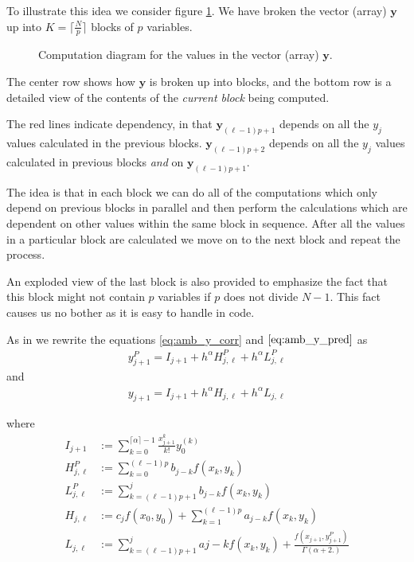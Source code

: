 To illustrate this idea we consider figure \ref{fig:comp_diag}. We have broken the vector (array) $ \mathbf{y} $ up into $ K = \lceil \frac{N}{p} \rceil $ blocks of $ p $ variables.


\begin{figure}[h]

\caption{Computation diagram for the values in the vector (array) $ \mathbf{y} $.}
\label{fig:comp_diag}
\end{figure} 

The center row shows how $ \mathbf{y} $ is broken up into blocks, and the bottom row is a detailed view
of the contents of the \emph{current block} being computed.

The red lines indicate dependency, in that $ \mathbf{y}_{(\ell - 1)p + 1} $ depends on all the $ y_j $ values calculated in the previous blocks. $ \mathbf{y}_{(\ell - 1)p + 2} $ depends on all the $ y_j $ values calculated in previous blocks \emph{and} on $ \mathbf{y}_{(\ell - 1)p + 1 } $. 

The idea is that in each block we can do all of the computations which only depend on previous blocks in parallel and then perform the calculations which are dependent on other values within the same block in sequence. After all the values in a particular block are calculated we move on to the next block and repeat the process.

An exploded view of the last block is also provided to emphasize the fact that this block might not contain $ p $ variables if $ p $ does not divide $ N - 1 $. This fact causes us no bother as it is easy to handle in code.

As in \cite{Diethelm2011} we rewrite the equations \eqref{eq:amb_y_corr} and $ \eqref{eq:amb_y_pred} $ as
\begin{align}
y_{j+1}^P = I_{j+1} + h^\alpha H_{j,\ell}^P + h^\alpha L_{j,\ell}^P
\end{align}
and
\begin{align}
y_{j+1} = I_{j+1} + h^{\alpha} H_{j,\ell} + h^\alpha L_{j,\ell}
\end{align}

where
\begin{align}
I_{j+1} & := \sum_{k=0}^{\lceil \alpha \rceil -1} \frac{x_{j+1}^k}{k!} y_0^{(k)} \\
H^P_{j,\ell} & := \sum_{k=0}^{(\ell-1)p} b_{j-k} f(x_k, y_k) \\
L_{j,\ell}^P & := \sum_{k=(\ell-1)p+1}^{j} b_{j-k} f(x_k,y_k) \\
H_{j,\ell} & := c_j f(x_0, y_0) + \sum_{k=1}^{(\ell - 1)p} a_{j-k}f(x_k, y_k) \\
L_{j,\ell} & := \sum_{k=(\ell-1)p + 1}^j a{j-k} f(x_k, y_k) + \frac{f(x_{j+1}, y^P_{j+1})}{\Gamma(\alpha + 2.)}
\end{align}

